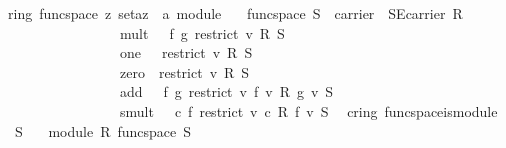 \begin{isabellebody}
\begin{isamarkuptext}
\end{isamarkuptext}%
\isamarkuptrue%
\isamarkupfalse%
\ {\isacharparenleft}\ ring{\isacharparenright}\ func{\isacharunderscore}space{\isacharcolon}{\isacharcolon}\ {\isachardoublequoteopen}{\isacharprime}z\ set{\isasymRightarrow}{\isacharparenleft}{\isacharprime}a{\isacharcomma}{\isacharparenleft}{\isacharprime}z\ {\isasymRightarrow}\ {\isacharprime}a{\isacharparenright}{\isacharparenright}\ module{\isachardoublequoteclose}\isanewline
\ \ \ {\isachardoublequoteopen}func{\isacharunderscore}space\ S\ {\isacharequal}\ {\isasymlparr}carrier\ {\isacharequal}\ S{\isasymrightarrow}\isactrlsub Ecarrier\ R{\isacharcomma}\ \isanewline
\ \ \ \ \ \ \ \ \ \ \ \ \ \ \ \ \ \ mult\ {\isacharequal}\ {\isacharparenleft}{\isasymlambda}\ f\ g{\isachardot}\ restrict\ {\isacharparenleft}{\isasymlambda}v{\isachardot}\ {\isasymzero}\isactrlbsub R\isactrlesub {\isacharparenright}\ S{\isacharparenright}{\isacharcomma}\isanewline
\ \ \ \ \ \ \ \ \ \ \ \ \ \ \ \ \ \ one\ {\isacharequal}\ \ restrict\ {\isacharparenleft}{\isasymlambda}v{\isachardot}\ {\isasymzero}\isactrlbsub R\isactrlesub {\isacharparenright}\ S{\isacharcomma}\isanewline
\ \ \ \ \ \ \ \ \ \ \ \ \ \ \ \ \ \ zero\ {\isacharequal}\ restrict\ {\isacharparenleft}{\isasymlambda}v{\isachardot}\ {\isasymzero}\isactrlbsub R\isactrlesub {\isacharparenright}\ S{\isacharcomma}\isanewline
\ \ \ \ \ \ \ \ \ \ \ \ \ \ \ \ \ \ add\ {\isacharequal}\ {\isacharparenleft}{\isasymlambda}\ f\ g{\isachardot}\ restrict\ {\isacharparenleft}{\isasymlambda}v{\isachardot}\ f\ v\ {\isasymoplus}\isactrlbsub R\isactrlesub \ g\ v{\isacharparenright}\ S{\isacharparenright}{\isacharcomma}\isanewline
\ \ \ \ \ \ \ \ \ \ \ \ \ \ \ \ \ \ smult\ {\isacharequal}\ {\isacharparenleft}{\isasymlambda}\ c\ f{\isachardot}\ restrict\ {\isacharparenleft}{\isasymlambda}v{\isachardot}\ c\ {\isasymotimes}\isactrlbsub R\isactrlesub \ f\ v{\isacharparenright}\ S{\isacharparenright}{\isasymrparr}{\isachardoublequoteclose}\isanewline
\isanewline
{}\isamarkupfalse%
\ {\isacharparenleft}\ cring{\isacharparenright}\ func{\isacharunderscore}space{\isacharunderscore}is{\isacharunderscore}module{\isacharcolon}\isanewline
\ \ \ S\isanewline
\ \ \ {\isachardoublequoteopen}module\ R\ {\isacharparenleft}func{\isacharunderscore}space\ S{\isacharparenright}{\isachardoublequoteclose}\ \isanewline
%
\isadelimproof
%
\endisadelimproof
%
\isatagproof
{}\isamarkupfalse%
\ {\isacharminus}\isanewline
{}\isamarkupfalse%

\end{isabellebody}
